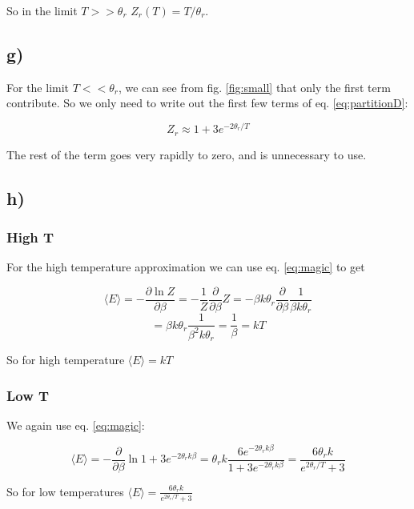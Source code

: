 \documentclass[a4paper,norsk, 10pt]{article}
\newcommand{\pd}[2]{\frac{\partial #1}{\partial #2}}
\begin{document}
So in the limit $T >> \theta_r$ $Z_r(T) = T/\theta_r$.


\subsection{g)}

For the limit $T << \theta_r$, we can see from fig. \ref{fig:small} that only the first term contribute. So we only need to write out the first few terms of eq. \eqref{eq:partitionD}:

\begin{equation}
Z_r \approx 1 + 3e^{-2\theta_r/T}
\end{equation}\label{eq:ZlowT}

The rest of the term goes very rapidly to zero, and is unnecessary to use.

\subsection{h)}
\subsubsection{High T}
For the high temperature approximation we can use eq. \eqref{eq:magic} to get

\begin{equation}
\langle E \rangle = -\pd{\ln Z}{\beta} = -\frac{1}{Z}\pd{}{\beta}Z = - \beta k \theta_r \pd{}{\beta} \frac{1}{\beta k \theta_r}
\end{equation}
\begin{equation}
= \beta k \theta_r \frac{1}{\beta^2 k \theta_r} = \frac{1}{\beta} = kT
\end{equation}\label{eq:highTE}

So for high temperature $\langle E \rangle= kT$

\subsubsection{Low T}
We again use eq. \eqref{eq:magic}:

\begin{equation}
\langle E \rangle = -\pd{}{\beta}\ln 1 +3e^{-2\theta_r k\beta}  = \theta_r k\frac{6e^{-2\theta_r k\beta}}{1 +3e^{-2\theta_r k\beta} } = \frac{6\theta_r k}{e^{2\theta_r/T} + 3}
\end{equation}\label{eq:lowTE}

So for low temperatures $\langle E \rangle = \frac{6\theta_r k}{e^{2\theta_r/T} + 3}$
\end{document}
